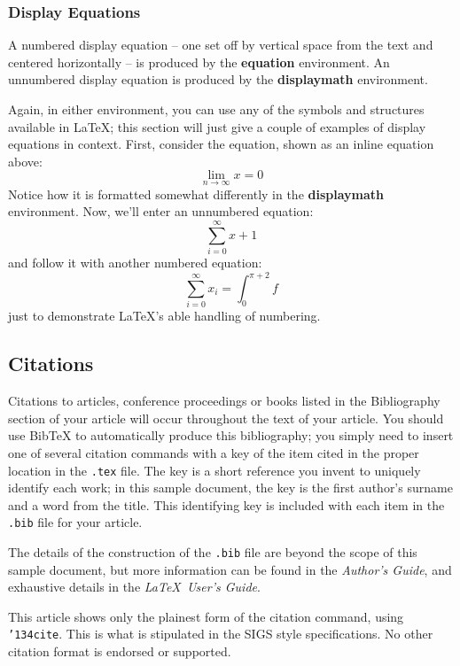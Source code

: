 \documentclass{sig-alternate}
\begin{document}
\subsubsection{Display Equations}
A numbered display equation -- one set off by vertical space
from the text and centered horizontally -- is produced
by the \textbf{equation} environment. An unnumbered display
equation is produced by the \textbf{displaymath} environment.

Again, in either environment, you can use any of the symbols
and structures available in \LaTeX; this section will just
give a couple of examples of display equations in context.
First, consider the equation, shown as an inline equation above:
\begin{equation}\lim_{n\rightarrow \infty}x=0\end{equation}
Notice how it is formatted somewhat differently in
the \textbf{displaymath}
environment.  Now, we'll enter an unnumbered equation:
\begin{displaymath}\sum_{i=0}^{\infty} x + 1\end{displaymath}
and follow it with another numbered equation:
\begin{equation}\sum_{i=0}^{\infty}x_i=\int_{0}^{\pi+2} f\end{equation}
just to demonstrate \LaTeX's able handling of numbering.

\subsection{Citations}
Citations to articles,
conference proceedings or
books listed
in the Bibliography section of your
article will occur throughout the text of your article.
You should use BibTeX to automatically produce this bibliography;
you simply need to insert one of several citation commands with
a key of the item cited in the proper location in
the \texttt{.tex} file.
The key is a short reference you invent to uniquely
identify each work; in this sample document, the key is
the first author's surname and a
word from the title.  This identifying key is included
with each item in the \texttt{.bib} file for your article.

The details of the construction of the \texttt{.bib} file
are beyond the scope of this sample document, but more
information can be found in the \textit{Author's Guide},
and exhaustive details in the \textit{\LaTeX\ User's
Guide}.

This article shows only the plainest form
of the citation command, using \texttt{{\char'134}cite}.
This is what is stipulated in the SIGS style specifications.
No other citation format is endorsed or supported.
\end{document}
